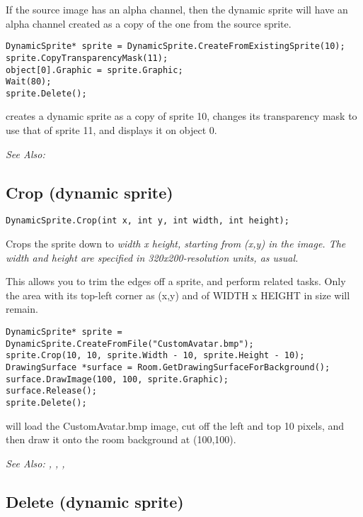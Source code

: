 If the source image has an alpha channel, then the dynamic sprite will have an
alpha channel created as a copy of the one from the source sprite.

\begin{verbatim}
DynamicSprite* sprite = DynamicSprite.CreateFromExistingSprite(10);
sprite.CopyTransparencyMask(11);
object[0].Graphic = sprite.Graphic;
Wait(80);
sprite.Delete();
\end{verbatim}
creates a dynamic sprite as a copy of sprite 10, changes its transparency mask
to use that of sprite 11, and displays it on object 0.

\it{See Also:} 


\subsection{Crop (dynamic sprite)}\label{DynamicSprite.Crop}%

\begin{verbatim}
DynamicSprite.Crop(int x, int y, int width, int height);
\end{verbatim}
Crops the sprite down to \it{width} x \it{height}, starting from (x,y) in the image.
The width and height are specified in 320x200-resolution units, as usual.

This allows you to trim the edges off a sprite, and perform related tasks. Only the area
with its top-left corner as (x,y) and of WIDTH x HEIGHT in size will remain.

\begin{verbatim}
DynamicSprite* sprite = DynamicSprite.CreateFromFile("CustomAvatar.bmp");
sprite.Crop(10, 10, sprite.Width - 10, sprite.Height - 10);
DrawingSurface *surface = Room.GetDrawingSurfaceForBackground();
surface.DrawImage(100, 100, sprite.Graphic);
surface.Release();
sprite.Delete();
\end{verbatim}
will load the CustomAvatar.bmp image, cut off the left and top 10 pixels, and then
draw it onto the room background at (100,100).

\it{See Also:} ,
,
,


\subsection{Delete (dynamic sprite)}\label{DynamicSprite.Delete}%

